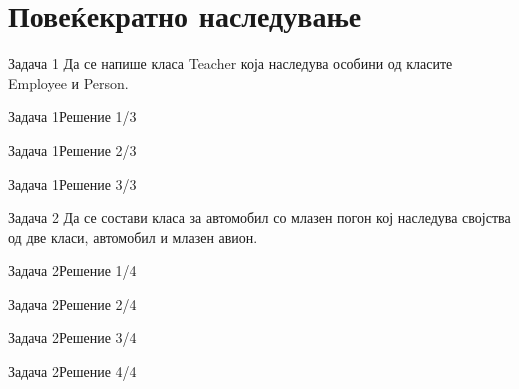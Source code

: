 \section{Повеќекратно наследување}

\begin{frame}{Задача 1}
Да се напише класа Teacher која наследува особини од класите Employee и Person.
\end{frame}

\begin{frame}[fragile]{Задача 1}{Решение 1/3}

\end{frame}

\begin{frame}[fragile]{Задача 1}{Решение 2/3}

\end{frame}

\begin{frame}[fragile]{Задача 1}{Решение 3/3}

\end{frame}

\begin{frame}{Задача 2}
Да се состави класа за автомобил со млазен погон кој наследува својства од две класи, автомобил и млазен авион.
\end{frame}

\begin{frame}[fragile]{Задача 2}{Решение 1/4}

\end{frame}

\begin{frame}[fragile]{Задача 2}{Решение 2/4}

\end{frame}

\begin{frame}[fragile]{Задача 2}{Решение 3/4}

\end{frame}

\begin{frame}[fragile]{Задача 2}{Решение 4/4}

\end{frame}

